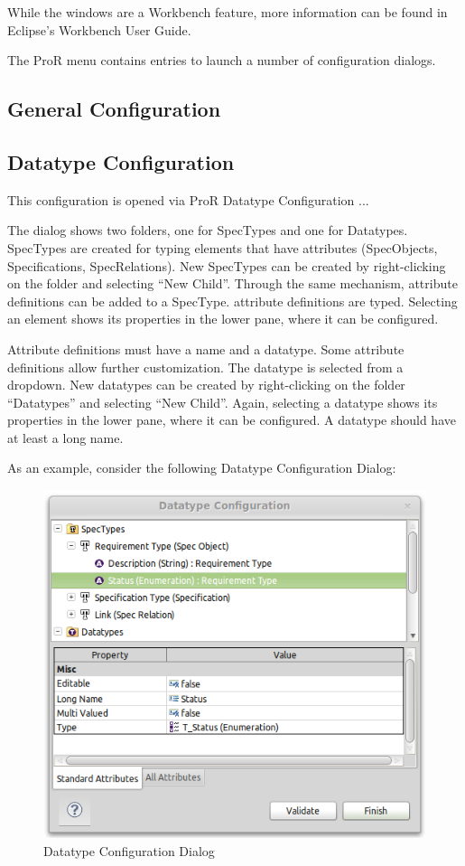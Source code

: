 While the windows are a Workbench feature, more information can be found in Eclipse's Workbench User Guide.  

The ProR menu contains entries to launch a number of configuration
dialogs.

\subsection{General Configuration}

\subsection{Datatype Configuration}

This configuration is opened via ProR \textbar{} Datatype Configuration
...

The dialog shows two folders, one for SpecTypes and one for Datatypes.
SpecTypes are created for typing elements that have attributes
(SpecObjects, Specifications, SpecRelations). New SpecTypes can be
created by right-clicking on the folder and selecting ``New Child''.
Through the same mechanism, attribute definitions can be added to a
SpecType. attribute definitions are typed. Selecting an element shows
its properties in the lower pane, where it can be configured.

Attribute definitions must have a name and a datatype. Some attribute
definitions allow further customization. The datatype is selected from a
dropdown. New datatypes can be created by right-clicking on the folder
``Datatypes'' and selecting ``New Child''. Again, selecting a datatype
shows its properties in the lower pane, where it can be configured. A
datatype should have at least a long name.

As an example, consider the following Datatype Configuration Dialog:

\begin{figure}[h!]
\centering      
\includegraphics[width=0.8\linewidth]{../rmf-images/pror_datatype_configuration.png}
\caption{Datatype Configuration Dialog}      
\label{fig:DatatypeConfig}
\end{figure}

